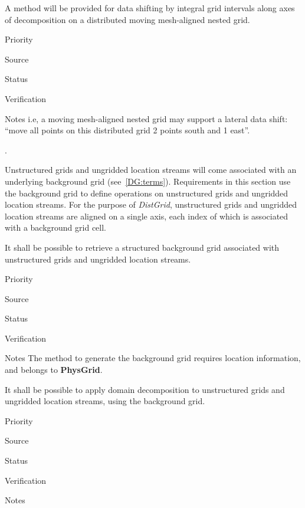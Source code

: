 
A method will be provided for data shifting by integral grid intervals
along axes of decomposition on a distributed moving mesh-aligned
nested grid.

\begin{reqlist}
\item[Priority]
\item[Source]
\item[Status]
\item[Verification]
\item[Notes] i.e, a moving mesh-aligned nested grid may support a
  lateral data shift: ``move all points on this distributed grid 2
  points south and 1 east''.
\end{reqlist}

 \label{DG:Unstructured}.

Unstructured grids and ungridded location streams will come associated
with an underlying background grid (see~\ref{DG:terms}). Requirements
in this section use the background grid to define operations on
unstructured grids and ungridded location streams. For the purpose of
\emph{DistGrid}, unstructured grids and ungridded location streams are
aligned on a single axis, each index of which is associated with a
background grid cell.


It shall be possible to retrieve a structured background grid
associated with unstructured grids and ungridded location streams.

\begin{reqlist}
\item[Priority]
\item[Source]
\item[Status]
\item[Verification]
\item[Notes] The method to generate the background grid requires
  location information, and belongs to \textbf{PhysGrid}.
\end{reqlist}


It shall be possible to apply domain decomposition to unstructured
grids and ungridded location streams, using the background grid.

\begin{reqlist}
\item[Priority]
\item[Source]
\item[Status]
\item[Verification]
\item[Notes]
\end{reqlist}

